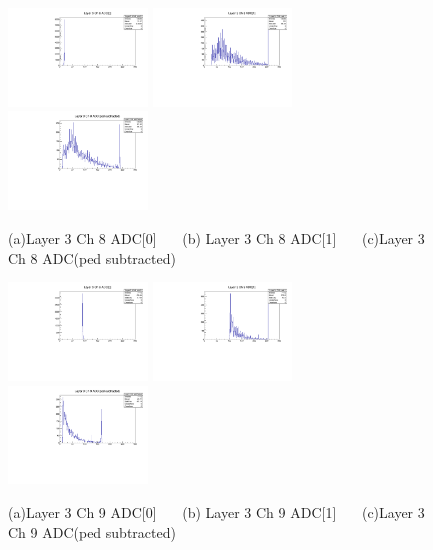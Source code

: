 \documentclass[a4paper,11pt]{article}
\theoremstyle{mytheor}
\begin{document}
\clearpage 
\begin{figure}[H] 
\vspace*{-0.3cm} 
\includegraphics[width=0.33\textwidth,scale=0.5,trim=0 0 0 0,clip]{plotsdir/file0_muons-Layer3_Ch8_adc0-1.pdf} 
\includegraphics[width=0.33\textwidth,scale=0.5,trim=0 0 0 0,clip]{plotsdir/file0_muons-Layer3_Ch8_adc1-1.pdf} 
\includegraphics[width=0.33\textwidth,scale=0.5,trim=0 0 0 0,clip]{plotsdir/file0_muons-Layer3_Ch8_adcPedsub-1.pdf} 
\caption{(a)Layer 3 Ch 8 ADC[0] ~~~(b) Layer 3 Ch 8 ADC[1] ~~~(c)Layer 3 Ch 8 ADC(ped subtracted) } 
\end{figure} 
\begin{figure}[H] 
\vspace*{-0.3cm} 
\includegraphics[width=0.33\textwidth,scale=0.5,trim=0 0 0 0,clip]{plotsdir/file0_muons-Layer3_Ch9_adc0-1.pdf} 
\includegraphics[width=0.33\textwidth,scale=0.5,trim=0 0 0 0,clip]{plotsdir/file0_muons-Layer3_Ch9_adc1-1.pdf} 
\includegraphics[width=0.33\textwidth,scale=0.5,trim=0 0 0 0,clip]{plotsdir/file0_muons-Layer3_Ch9_adcPedsub-1.pdf} 
\caption{(a)Layer 3 Ch 9 ADC[0] ~~~(b) Layer 3 Ch 9 ADC[1] ~~~(c)Layer 3 Ch 9 ADC(ped subtracted) } 
\end{figure} 
\newpage 
\end{document}

